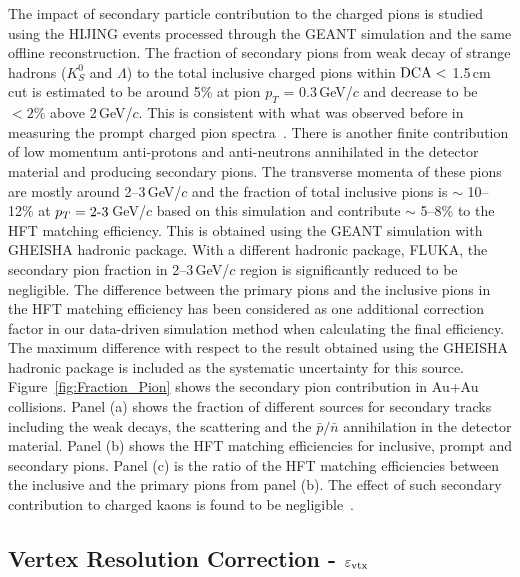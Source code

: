 \documentclass[%
 reprint,	
 amsmath,amssymb,
 aps,
 prc,
]{revtex4-1}
\begin{document}
The impact of secondary particle contribution to the charged pions is studied using the HIJING events processed through the GEANT simulation and the same offline reconstruction. The fraction of secondary pions from weak decay of strange hadrons ($K^0_S$ and $\Lambda$) to the total inclusive charged pions within ${\rm DCA}<$ 1.5\,cm cut is estimated to be around 5\% at pion $p_{T}$ = 0.3\,GeV/$c$ and decrease to be $<2\%$ above 2\,GeV/$c$. This is consistent with what was observed before in measuring the prompt charged pion spectra~\cite{Adams:2003xp}. There is another finite contribution of low momentum anti-protons and anti-neutrons annihilated in the detector material and producing secondary pions. The transverse momenta of these pions are mostly around 2--3\,GeV/$c$ and the fraction of total inclusive pions is $\sim$ 10--12\% at $p_{T} =2\textup{-}3$\,GeV/$c$ based on this simulation and contribute $\sim$ 5--8\% to the HFT matching efficiency. This is obtained using the GEANT simulation with GHEISHA hadronic package. With a different hadronic package, FLUKA, the secondary pion fraction in 2--3\,GeV/$c$ region is significantly reduced to be negligible. The difference between the primary pions and the inclusive pions in the HFT matching efficiency has been considered as one additional correction factor in our data-driven simulation method when calculating the final efficiency. The maximum difference with respect to the result obtained using the GHEISHA hadronic package is included as the systematic uncertainty for this source. Figure~\ref{fig:Fraction_Pion} shows the secondary pion contribution in Au+Au collisions. Panel (a) shows the fraction of different sources for secondary tracks including the weak decays, the scattering and the $\bar{p}/\bar{n}$ annihilation in the detector material. Panel (b) shows the HFT matching efficiencies for inclusive, prompt and secondary pions. Panel (c) is the ratio of the HFT matching efficiencies between the inclusive and the primary pions from panel (b). The effect of such secondary contribution to charged kaons is found to be negligible~\cite{Adams:2003xp}.

\subsection{Vertex Resolution Correction - $\varepsilon_{\rm vtx}$}
\label{correction:vtx}
\end{document}
